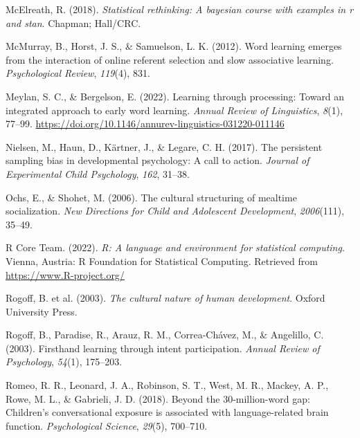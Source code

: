\documentclass[
  man,floatsintext]{apa6}
\newlength{\cslhangindent}
\newlength{\cslentryspacingunit} %
\newenvironment{CSLReferences}[2] %
 {%
  \setlength{\parindent}{0pt}
  \ifodd #1
  \let\oldpar\par
  \def\par{\hangindent=\cslhangindent\oldpar}
  \fi
  \setlength{\parskip}{#2\cslentryspacingunit}
 }%
 {}
\begin{document}
\begin{CSLReferences}{1}{0}
\leavevmode{}%
McElreath, R. (2018). \emph{Statistical rethinking: A bayesian course with examples in r and stan}. Chapman; Hall/CRC.

\leavevmode{}%
McMurray, B., Horst, J. S., \& Samuelson, L. K. (2012). Word learning emerges from the interaction of online referent selection and slow associative learning. \emph{Psychological Review}, \emph{119}(4), 831.

\leavevmode{}%
Meylan, S. C., \& Bergelson, E. (2022). Learning through processing: Toward an integrated approach to early word learning. \emph{Annual Review of Linguistics}, \emph{8}(1), 77--99. \url{https://doi.org/10.1146/annurev-linguistics-031220-011146}

\leavevmode{}%
Nielsen, M., Haun, D., Kärtner, J., \& Legare, C. H. (2017). The persistent sampling bias in developmental psychology: A call to action. \emph{Journal of Experimental Child Psychology}, \emph{162}, 31--38.

\leavevmode{}%
Ochs, E., \& Shohet, M. (2006). The cultural structuring of mealtime socialization. \emph{New Directions for Child and Adolescent Development}, \emph{2006}(111), 35--49.

\leavevmode{}%
R Core Team. (2022). \emph{R: A language and environment for statistical computing}. Vienna, Austria: R Foundation for Statistical Computing. Retrieved from \url{https://www.R-project.org/}

\leavevmode{}%
Rogoff, B. et al. (2003). \emph{The cultural nature of human development}. Oxford University Press.

\leavevmode{}%
Rogoff, B., Paradise, R., Arauz, R. M., Correa-Chávez, M., \& Angelillo, C. (2003). Firsthand learning through intent participation. \emph{Annual Review of Psychology}, \emph{54}(1), 175--203.

\leavevmode{}%
Romeo, R. R., Leonard, J. A., Robinson, S. T., West, M. R., Mackey, A. P., Rowe, M. L., \& Gabrieli, J. D. (2018). Beyond the 30-million-word gap: Children's conversational exposure is associated with language-related brain function. \emph{Psychological Science}, \emph{29}(5), 700--710.


\end{CSLReferences}
\end{document}
